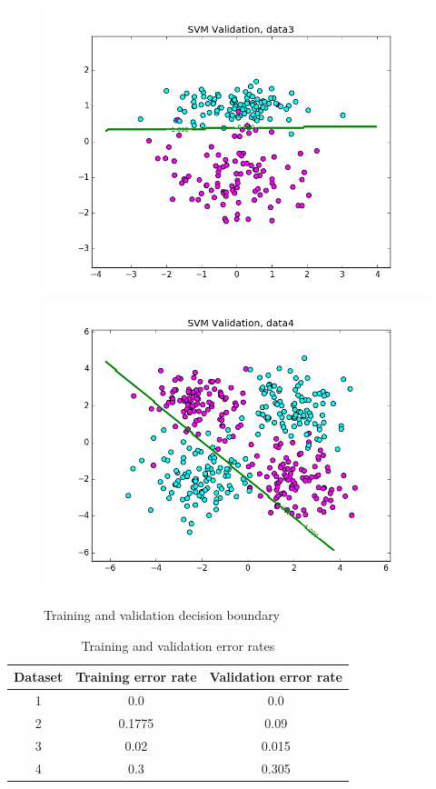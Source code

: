 \documentclass{article}
\begin{document}
\begin{figure}[width=\linewidth]
\begin{multicols}{2}
  \includegraphics[width=1.2\linewidth]{code/P2/data3,validation.png}
  \includegraphics[width=1.2\linewidth]{code/P2/data4,validation.png}
\end{multicols}
\caption{Training and validation decision boundary}
\end{figure}

\begin{table}
  \begin{center}
    \begin{tabular}{ | c | c | c | }
      \hline
      Dataset & Training error rate & Validation error rate \\ \hline
      1       & 0.0                 & 0.0                   \\ \hline
      2       & 0.1775              & 0.09                  \\ \hline
      3       & 0.02                & 0.015                 \\ \hline
      4       & 0.3                 & 0.305                 \\ \hline
    \end{tabular}
  \end{center}
  \caption{Training and validation error rates}
\end{table}
\end{document}
